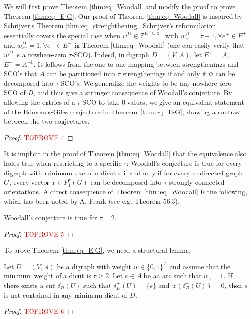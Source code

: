 \documentclass[runningheads]{llncs}
\newcommand{\Z}{\mathbb{Z}}
\begin{document}
We will first prove Theorem \ref{thm:eq_Woodall} and modify the proof to prove Theorem \ref{thm:eq_E-G}. Our proof of Theorem \ref{thm:eq_Woodall} is inspired by Schrijver's Theorem \ref{thm:eq_strenghthening}. Schrijver's reformulation essentially covers the special case when $\bar{w}^D\in\Z^{E^+\cup E^-}$ with $\bar{w}^D_{e^+}=\tau-1,\forall e^+\in E^+$ and $\bar{w}^D_{e^-}=1,\forall e^-\in E^-$ in Theorem \ref{thm:eq_Woodall} (one can easily verify that $\bar{w}^D$ is a nowhere-zero $\tau$-SCO). Indeed, in  digraph $D=(V,A)$, let $E^+=A$, $E^-=A^{-1}$. It follows from the one-to-one mapping between strengthenings and SCO's that $A$ can be partitioned into $\tau$ strengthenings if and only if $\bar{w}$ can be decomposed into $\tau$ SCO's.  We generalize the weights to be any nowhere-zero $\tau$-SCO of $D$, and thus give a stronger consequence of Woodall's conjecture. By allowing the entries of a $\tau$-SCO to take $0$ values, we give an equivalent statement of the Edmonds-Giles conjecture in Theorem~\ref{thm:eq_E-G}, showing a contrast between the two conjectures.


\begin{proof}\textcolor{red}{TOPROVE 4}\end{proof}

It is implicit in the proof of Theorem \ref{thm:eq_Woodall} that the equivalence also holds true when restricting to a specific $\tau$:  Woodall's conjecture is true for every digraph with minimum size of a dicut $\tau$ if and only if for every undirected graph $G$, every vector $x\in P_1^\tau(G)$ can be decomposed into $\tau$ strongly connected orientations. A direct consequence of Theorem \ref{thm:eq_Woodall} is the following, which has been noted by A. Frank (see e.g. \cite{schrijver2003combinatorial} Theorem 56.3).
\begin{corollary}\label{cor:tau=2}
    Woodall's conjecture is true for $\tau=2$.
\end{corollary}
\begin{proof}\textcolor{red}{TOPROVE 5}\end{proof}



 To prove Theorem \ref{thm:eq_E-G}, we need a structural lemma.    
    \begin{lemma}\label{lemma:near_dicut}
        Let $D=(V,A)$ be a digraph with weight $w\in\{0,1\}^A$ and assume that the minimum weight of a dicut is $\tau\geq 2$. Let $e\in A$ be an arc such that $w_e=1$. If there exists a cut $\delta_D(U)$ such that $\delta_D^+(U)=\{e\}$ and $w(\delta_D^-(U))=0$, then $e$ is not contained in any minimum dicut of $D$.
    \end{lemma}
    \begin{proof}\textcolor{red}{TOPROVE 6}\end{proof}
        
\end{document}
